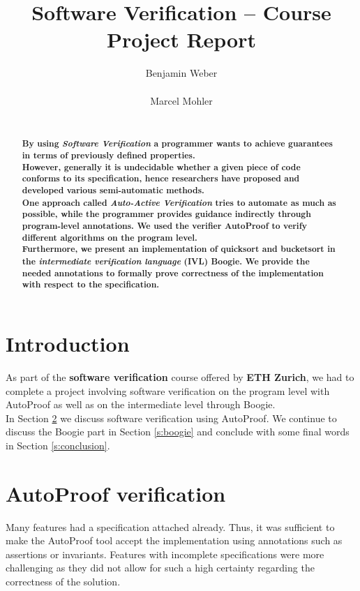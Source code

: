 \documentclass{report}
\title{Software Verification -- Course Project Report}
\author{
%
%
\alignauthor Benjamin Weber\\
	\affaddr{ETH ID 11-933-017}\\
	\email{benweber@student.ethz.ch}
\alignauthor Marcel Mohler\\
	\affaddr{ETH ID 09-922-998}\\
	\email{mohlerm@student.ethz.ch}
}
\begin{document}
\maketitle

\begin{abstract}
\textbf{By using \textit{Software Verification} a programmer wants to achieve guarantees in terms of previously defined properties.\\
However, generally it is undecidable whether a given piece of code conforms to its specification, hence researchers have proposed and developed various semi-automatic methods.\\
One approach called \textit{Auto-Active Verification} tries to automate as much as possible, while the programmer provides guidance indirectly through program-level annotations\cite{tschannen2011verifying}\cite{autoactivelecture}.
We used the verifier AutoProof\cite{autoproof} to verify different algorithms on the program level. \\Furthermore, we present an implementation of \textbf{quicksort}\cite{quicksort} and \textbf{bucketsort}\cite{bucketsort} in the \textit{intermediate verification language} (IVL) Boogie\cite{barnett2006boogie}\cite{boogie}. We provide the needed annotations to formally prove correctness of the implementation with respect to the specification.
}
\end{abstract}

\section{Introduction}
\label{s:introduction}
As part of the \textbf{software verification} course offered by \textbf{ETH Zurich},
we had to complete a project involving software verification on the program
level with AutoProof as well as on the intermediate level through Boogie.\\
In Section \ref{s:autoproof} we discuss software verification using AutoProof.
We continue to discuss the Boogie part in Section \ref{s:boogie} and conclude with some final words in Section \ref{s:conclusion}.

\section{AutoProof verification}
\label{s:autoproof}

Many features had a specification attached already. Thus, it was sufficient to make the AutoProof tool accept the implementation using annotations such as assertions
or invariants. Features with incomplete specifications were more challenging as
they did not allow for such a high certainty regarding the correctness of the
solution.
\end{document}
